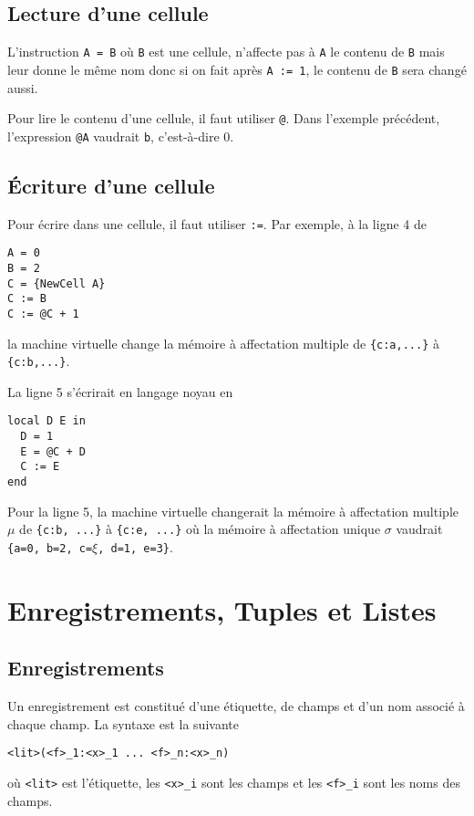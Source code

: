 \subsection{Lecture d'une cellule}
L'instruction
\lstinline|A = B|
où \lstinline|B| est une cellule,
n'affecte pas à \lstinline|A| le contenu de \lstinline|B| mais leur donne
le même nom donc si on fait après \lstinline|A := 1|,
le contenu de \lstinline|B| sera changé aussi.

Pour lire le contenu d'une cellule, il faut utiliser \lstinline|@|.
Dans l'exemple précédent, l'expression \lstinline|@A| vaudrait \lstinline|b|,
c'est-à-dire 0.

\subsection{Écriture d'une cellule}
Pour écrire dans une cellule, il faut utiliser \lstinline|:=|.
Par exemple, à la ligne 4 de
\begin{lstlisting}
A = 0
B = 2
C = {NewCell A}
C := B
C := @C + 1
\end{lstlisting}
la machine virtuelle change la mémoire à affectation multiple
de \lstinline|{c:a,...}| à \lstinline|{c:b,...}|.

La ligne 5 s'écrirait en langage noyau en
\begin{lstlisting}
local D E in
  D = 1
  E = @C + D
  C := E
end
\end{lstlisting}
Pour la ligne 5, la machine virtuelle changerait la mémoire
à affectation multiple $\mu$ de
\lstinline|{c:b, ...}| à \lstinline|{c:e, ...}| où la mémoire
à affectation unique $\sigma$ vaudrait
\lstinline|{a=0, b=2, c=|$\xi$\lstinline|, d=1, e=3}|.


\section{Enregistrements, Tuples et Listes}
\subsection{Enregistrements}
Un enregistrement est constitué d'une étiquette, de champs et
d'un nom associé à chaque champ.
La syntaxe est la suivante
\begin{lstlisting}
<lit>(<f>_1:<x>_1 ... <f>_n:<x>_n)
\end{lstlisting}
où \lstinline|<lit>| est l'étiquette,
les \lstinline|<x>_i| sont les champs et
les \lstinline|<f>_i| sont les noms des champs.


